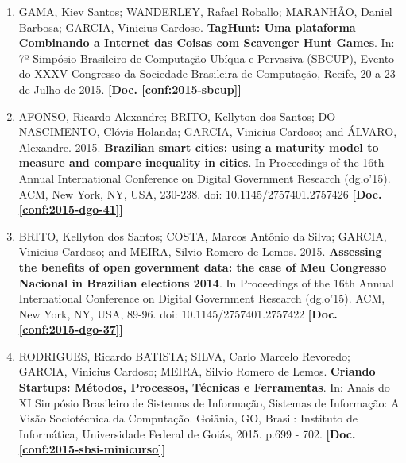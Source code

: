 \documentclass[a4paper,oneside,10pt]{article}
\begin{document}
\begin{enumerate}

\item GAMA, Kiev Santos; WANDERLEY, Rafael Roballo; MARANHÃO, Daniel Barbosa; GARCIA, Vinicius Cardoso. \textbf{TagHunt: Uma plataforma Combinando a Internet das Coisas com Scavenger Hunt Games}. In: 7º Simpósio Brasileiro de Computação Ubíqua e Pervasiva (SBCUP), Evento do XXXV Congresso da Sociedade Brasileira de Computação, Recife, 20 a 23 de Julho de 2015. \textbf{[Doc. \ref{conf:2015-sbcup}]}

\item AFONSO, Ricardo Alexandre; BRITO, Kellyton dos Santos; DO NASCIMENTO, Clóvis Holanda; GARCIA, Vinicius Cardoso; and ÁLVARO, Alexandre. 2015. \textbf{Brazilian smart cities: using a maturity model to measure and compare inequality in cities}. In Proceedings of the 16th Annual International Conference on Digital Government Research (dg.o'15). ACM, New York, NY, USA, 230-238. doi: 10.1145/2757401.2757426 \textbf{[Doc. \ref{conf:2015-dgo-41}]}

\item BRITO, Kellyton dos Santos; COSTA, Marcos Antônio da Silva; GARCIA, Vinicius Cardoso; and MEIRA, Silvio Romero de Lemos. 2015. \textbf{Assessing the benefits of open government data: the case of Meu Congresso Nacional in Brazilian elections 2014}. In Proceedings of the 16th Annual International Conference on Digital Government Research (dg.o'15). ACM, New York, NY, USA, 89-96. doi: 10.1145/2757401.2757422 \textbf{[Doc. \ref{conf:2015-dgo-37}]}

\item RODRIGUES, Ricardo BATISTA; SILVA, Carlo Marcelo Revoredo; GARCIA, Vinicius Cardoso; MEIRA, Silvio Romero de Lemos. \textbf{Criando Startups: Métodos, Processos, Técnicas e Ferramentas}. In: Anais do XI Simpósio Brasileiro de Sistemas de Informação, Sistemas de Informação: A Visão Sociotécnica da Computação. Goiânia, GO, Brasil: Instituto de Informática, Universidade Federal de Goiás, 2015. p.699 - 702. \textbf{[Doc. \ref{conf:2015-sbsi-minicurso}]}


\end{enumerate}
\end{document}
